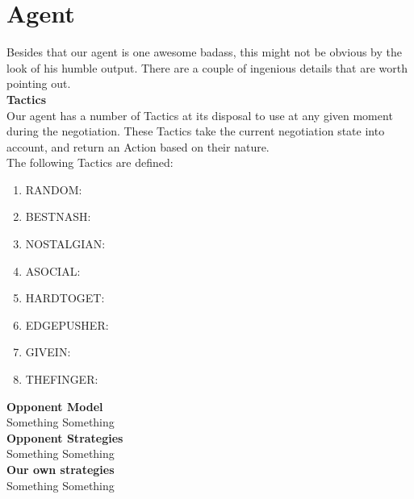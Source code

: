 \section*{Agent}
Besides that our agent is one awesome badass, this might not be obvious by the look of his humble output. There are a couple of ingenious details that are worth pointing out.\\

\textbf{Tactics}\\
Our agent has a number of Tactics at its disposal to use at any given moment during the negotiation. These Tactics take the current negotiation state into account, and return an Action based on their nature. \\

\noindent The following Tactics are defined:
\begin{enumerate}
\item RANDOM:
\item BESTNASH:
\item NOSTALGIAN:
\item ASOCIAL:
\item HARDTOGET:
\item EDGEPUSHER:
\item GIVEIN:
\item THEFINGER:
\end{enumerate}



\textbf{Opponent Model}\\
Something Something\\

\textbf{Opponent Strategies}\\
Something Something\\

\textbf{Our own strategies}\\
Something Something\\

